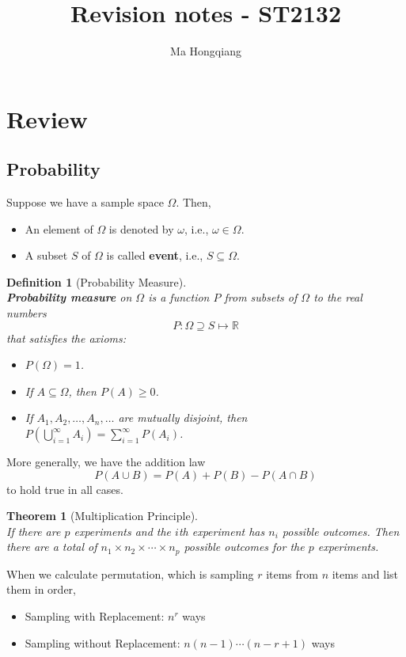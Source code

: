\documentclass[12pt]{article}
\newtheorem{definition}{Definition}[section]
\newtheorem{theorem}{Theorem}[section]
\theoremstyle{definition}
\begin{document}
\title{Revision notes - ST2132}
\author{Ma Hongqiang}
\maketitle
\tableofcontents

\clearpage
\section{Review}
\subsection{Probability}
Suppose we have a sample space $\Omega$. Then, 
\begin{itemize}
  \item An element of $\Omega$ is denoted by $\omega$, i.e., $\omega \in \Omega$.
  \item A subset $S$ of $\Omega$ is called \textbf{event}, i.e., $S\subseteq \Omega$.
\end{itemize}
\begin{definition}[Probability Measure]
\hfill\\\normalfont \textbf{Probability measure} on $\Omega$ is a function $P$ from subsets of $\Omega$ to the real numbers
\[
P:\Omega \supseteq S \mapsto \mathbb{R}
\]
that satisfies the axioms:
\begin{itemize}
  \item $P(\Omega) = 1$.
  \item If $A\subseteq \Omega$, then $P(A)\geq 0$.
  \item If $A_1, A_2, \ldots, A_n,\ldots$ are mutually disjoint, then $P\left(\bigcup_{i=1}^\infty A_i\right) = \sum_{i=1}^\infty P(A_i)$.
\end{itemize}
\end{definition}
More generally, we have the addition law
\[
P(A\cup B) = P(A)+P(B)-P(A\cap B)
\]
to hold true in all cases.
\begin{theorem}[Multiplication Principle]
\hfill\\\normalfont If there are $p$ experiments and the $i$th experiment has $n_i$ possible outcomes. Then there are a total of $n_1\times n_2\times \cdots\times n_p$ possible outcomes for the $p$ experiments.
\end{theorem}
When we calculate permutation, which is sampling $r$ items from $n$ items and list them in order, 
\begin{itemize}
  \item Sampling with Replacement: $n^r$ ways
  \item Sampling without Replacement: $n(n-1)\cdots(n-r+1)$ ways
\end{itemize}
\end{document}

